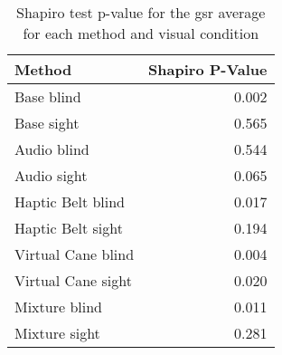 
\begin{table}[!htb]
\centering
\caption{Shapiro test p-value for the gsr average for each method and visual condition}
\label{tab:shapiro_gsr}
\begin{tabular}{lr}
\toprule
            Method &  Shapiro P-Value \\
\midrule
        Base blind &            0.002 \\
        Base sight &            0.565 \\
       Audio blind &            0.544 \\
       Audio sight &            0.065 \\
 Haptic Belt blind &            0.017 \\
 Haptic Belt sight &            0.194 \\
Virtual Cane blind &            0.004 \\
Virtual Cane sight &            0.020 \\
     Mixture blind &            0.011 \\
     Mixture sight &            0.281 \\
\bottomrule
\end{tabular}
\end{table}

